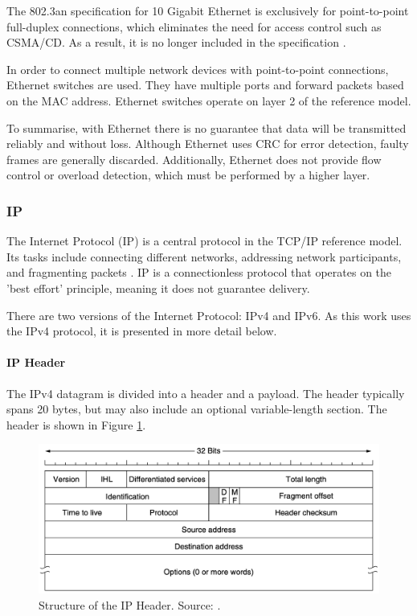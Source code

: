 The 802.3an specification for 10 Gigabit Ethernet is exclusively for point-to-point full-duplex connections, which eliminates the need for access control such as CSMA/CD. As a result, it is no longer included in the specification \cite{10GbEDefinition}.

In order to connect multiple network devices with point-to-point connections, Ethernet switches are used. They have multiple ports and forward packets based on the MAC address. Ethernet switches operate on layer 2 of the reference model.

To summarise, with Ethernet there is no guarantee that data will be transmitted reliably and without loss. Although Ethernet uses CRC for error detection, faulty frames are generally discarded. Additionally, Ethernet does not provide flow control or overload detection, which must be performed by a higher layer.


\subsubsection{IP}

The Internet Protocol (IP) is a central protocol in the TCP/IP reference model. Its tasks include connecting different networks, addressing network participants, and fragmenting packets \cite{Weigel2021}. IP is a connectionless protocol that operates on the 'best effort' principle, meaning it does not guarantee delivery.

There are two versions of the Internet Protocol: IPv4 and IPv6. As this work uses the IPv4 protocol, it is presented in more detail below.

\paragraph{IP Header} \label{chap:ipheader}

The IPv4 datagram is divided into a header and a payload. The header typically spans 20 bytes, but may also include an optional variable-length section. The header is shown in Figure \ref{fig:IPHeader}.

\begin{figure}[h]
    \centering
    \includegraphics[width=1\linewidth]{figures/tcpip_refmodel/image7.png}
    \caption[Structure of the IP Header]{Structure of the IP Header. Source: \cite{Tanenbaum2010}.}
    \label{fig:IPHeader}
\end{figure}

